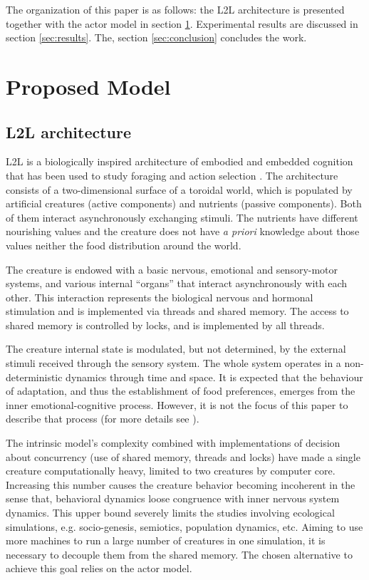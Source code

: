 \documentclass[runningheads]{llncs}
\begin{document}
The organization of this paper is as follows: the L2L architecture is presented together with the actor model in section \ref{sec:model}. Experimental results are discussed in section \ref{sec:results}. The, section \ref{sec:conclusion} concludes the work.

\section{Proposed Model}
\label{sec:model}

\subsection{L2L architecture}
\label{subsec:l2l}
L2L is a biologically inspired architecture of embodied and embedded cognition that has been used to study foraging and action selection \cite{Campos}. The architecture consists of a two-dimensional surface of a toroidal world, which is populated by artificial creatures (active components) and nutrients (passive components). Both of them interact asynchronously exchanging stimuli. The nutrients have different nourishing values and the creature does not have \textit{a priori} knowledge about those values neither the food distribution around the world. 

The creature is endowed with a basic nervous, emotional and sensory-motor systems, and various internal ``organs'' that interact asynchronously with each other. This interaction represents the biological nervous and hormonal stimulation and is implemented via threads and shared memory. The access to shared memory is controlled by locks, and is implemented by all threads.

The creature internal state is modulated, but not determined, by the external stimuli received through the sensory system. The whole system operates in a non-deterministic dynamics through time and space. It is expected that the behaviour of adaptation, and thus the establishment of food preferences, emerges from the inner emotional-cognitive process. However, it is not the focus of this paper to describe that process (for more details see \cite{Campos}).

The intrinsic model's complexity combined with implementations of decision about concurrency (use of shared memory, threads and locks) have made a single creature computationally heavy, limited to two creatures by computer core. Increasing this number causes the creature behavior becoming incoherent in the sense that, behavioral dynamics loose congruence with inner nervous system dynamics. This upper bound  severely limits the studies involving ecological simulations, e.g. socio-genesis, semiotics, population dynamics, etc. Aiming to use more machines to run a large number of creatures in one simulation, it is necessary to decouple them from the shared memory. The chosen alternative to achieve this goal relies on the actor model.
\end{document}
